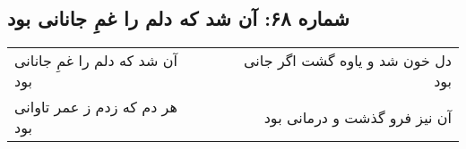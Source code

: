 \begin{center}
\section*{شماره ۶۸: آن شد که دلم را غمِ جانانی بود}
\label{sec:068}
\begin{longtable}{l p{0.5cm} r}
آن شد که دلم را غمِ جانانی بود
&&
دل خون شد و یاوه گشت اگر جانی بود
\\
هر دم که زدم ز عمر تاوانی بود
&&
آن نیز فرو گذشت و درمانی بود
\\
\end{longtable}
\end{center}
